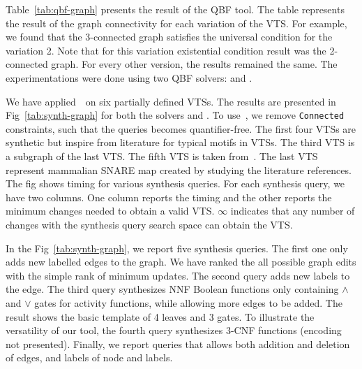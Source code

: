 
Table~\ref{tab:qbf-graph} presents the result of the QBF tool.
%
The table represents the result of the graph connectivity for each variation of the VTS.  
%
For example, we found that the 3-connected graph satisfies the universal condition for the variation 2. 
%
Note that for this variation existential condition result was the 2-connected graph. 
%
For every other version, the results remained the same.
% 
The experimentations were done using two QBF solvers: \depqbf and \rarqbf.


We have applied~\ourtool~on six partially defined VTSs.
%
The results are presented in Fig~\ref{tab:synth-graph} for both the solvers
\depqbf and \zthree.
%
To use~\zthree, we remove \texttt{Connected} constraints, such that the queries becomes
quantifier-free.
%
%
%
The first four VTSs are synthetic but inspire from literature for
typical motifs in VTSs. 
The third VTS is a subgraph of the last VTS.
%
%
The fifth VTS is taken from~\cite{burri2004complete}.
%
The last VTS represent mammalian SNARE map created by studying the literature references.  
%
The fig shows timing for various synthesis queries.
%
For each synthesis query, we have two columns.
%
One column reports the timing and the other reports the minimum changes needed to obtain a valid VTS.
%
$\infty$ indicates that any number of changes with the synthesis query
search space can obtain the VTS.
%

In the Fig~\ref{tab:synth-graph}, we report five synthesis queries.
%
The first one only adds new labelled edges to the graph.
%
We have ranked the all possible graph edits with the simple rank of
minimum updates.
%
The second query adds new labels to the edge.
%
The third query synthesizes NNF Boolean functions only containing
$\land$ and $\lor$ gates for activity functions, while allowing
more edges to be added.
%
The result shows the basic template of 4 leaves and 3 gates.
%
%
To illustrate the versatility of our tool, the fourth query
synthesizes $3$-CNF functions (encoding not presented).
%
Finally, we report queries that allows both addition and deletion of edges, and labels
of node and labels. 

%
%

